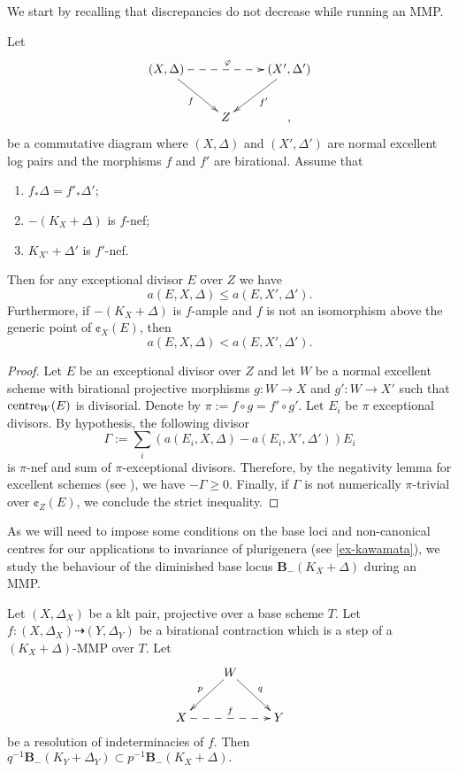 	We start by recalling that discrepancies do not decrease while running an MMP.
		\begin{lemma}\label{l:increase-discr}
		Let 
		\[
		\xymatrix{
			(X,\Delta) \ar[dr]_{f}   \ar@{-->}[rr]^{\varphi} &  &  (X', \Delta') \ar[dl]^{f'}  \\
			&Z & ,
		}
		\]
		be a commutative diagram  where $(X,\Delta)$ and $(X', \Delta')$ are normal excellent log pairs and the morphisms $f$ and $f'$ are birational.
		Assume that
		\begin{enumerate}
			\item $f_*\Delta=f'_*\Delta'$;
			\item $-(K_X+\Delta)$ is $f$-nef;
			\item $K_{X'}+\Delta'$ is $f'$-nef. 
		\end{enumerate}
		Then for any exceptional divisor $E$ over $Z$ we have $$a(E, X, \Delta ) \leq a(E, X', \Delta').$$
		Furthermore, if $-(K_X+\Delta)$ is $f$-ample and $f$ is not an isomorphism above the generic point of $\cent_X(E)$, then
		$$ a(E, X, \Delta ) < a(E, X', \Delta').$$
	\end{lemma}
	\begin{proof}
		Let $E$ be an exceptional divisor over $Z$ and let $W$ be a normal excellent scheme with birational projective morphisms $g \colon W \to X$ and $g' \colon W \to X'$ such that $\textup{centre}_W(E)$ is divisorial. Denote by $\pi:= f \circ g=f' \circ g'$. Let $E_{i}$ be $\pi$ exceptional divisors. By hypothesis, the following divisor
		$$\Gamma:= \sum_i \left( a(E_i, X, \Delta)-a(E_i, X', \Delta') \right)E_i $$ 
		is $\pi$-nef and sum of $\pi$-exceptional divisors.
		Therefore, by the negativity lemma for excellent schemes (see \cite[Lemma 2.14]{bhatt2020}), we have $-\Gamma\geq 0$. Finally, if $\Gamma$ is not numerically $\pi$-trivial over $\cent_Z(E)$, we conclude the strict inequality.
	\end{proof}
	
	As we will need to impose some conditions on the base loci and non-canonical centres for our applications to invariance of plurigenera (see \autoref{ex-kawamata}), we study the behaviour of the diminished base locus $\mathbf{B}_{-}(K_X+\Delta)$ during an MMP.
	
	
	\begin{lemma}\label{l-stable-base-loci}
		Let $(X,\Delta_X)$ be a klt pair, projective over a base scheme $T$.
		Let $f\colon (X, \Delta_X) \dashrightarrow (Y, \Delta_Y)$ be a birational contraction which is a step of a  $(K_X+\Delta)$-MMP over $T$.
		Let
		\begin{equation*}
			\xymatrix{
				& W \ar[dr]^q \ar[dl]_p & \\
				X \ar@{-->}[rr]^{f} & & Y}
		\end{equation*} 
		be a resolution of indeterminacies of $f$.
		Then $q^{-1}\mathbf{B}_{-}(K_Y+\Delta_Y) \subset p^{-1}\mathbf{B}_{-}(K_X+\Delta).$
	\end{lemma}
	
